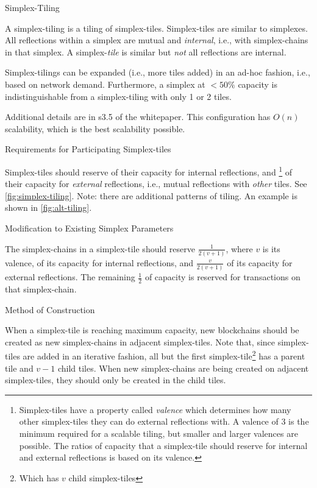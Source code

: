 \begin{section}{Simplex-Tiling}

 A simplex-tiling is a tiling of simplex-tiles. Simplex-tiles are similar to simplexes. All reflections within a simplex are mutual and \emph{internal}, i.e., with simplex-chains in that simplex. A simplex-\emph{tile} is similar but \emph{not} all reflections are internal.

 Simplex-tilings can be expanded (i.e., more tiles added) in an ad-hoc fashion, i.e., based on network demand. Furthermore, a simplex at $<50\%$ capacity is indistinguishable from a simplex-tiling with only 1 or 2 tiles.

 Additional details are in s3.5 of the whitepaper. This configuration has $O(n)$ scalability, which is the best scalability possible.

 \begin{subsection}{Requirements for Participating Simplex-tiles}

     Simplex-tiles should reserve  of their capacity for internal reflections, and \footnote{Simplex-tiles have a property called \emph{valence} which determines how many other simplex-tiles they can do external reflections with. A valence of 3 is the minimum required for a scalable tiling, but smaller and larger valences are possible. The ratios of capacity that a simplex-tile should reserve for internal and external reflections is based on its valence.} of their capacity for \emph{external} reflections, i.e., mutual reflections with \emph{other} tiles. See \autoref{fig:simplex-tiling}. Note: there are additional patterns of tiling. An example is shown in \autoref{fig:alt-tiling}.

 \end{subsection}
 \begin{subsection}{Modification to Existing Simplex Parameters}

     The simplex-chains in a simplex-tile should reserve $\frac{1}{2(v + 1)}$, where $v$ is its valence, of its capacity for internal reflections, and $\frac{v}{2(v+1)}$ of its capacity for external reflections. The remaining $\frac{1}{2}$ of capacity is reserved for transactions on that simplex-chain.

 \end{subsection}
 \begin{subsection}{Method of Construction}

     When a simplex-tile is reaching maximum capacity, new blockchains should be created as new simplex-chains in adjacent simplex-tiles. Note that, since simplex-tiles are added in an iterative fashion, all but the first simplex-tile\footnote{Which has $v$ child simplex-tiles} has a parent tile and $v-1$ child tiles. When new simplex-chains are being created on adjacent simplex-tiles, they should only be created in the child tiles.


\end{subsection}
\end{section}
